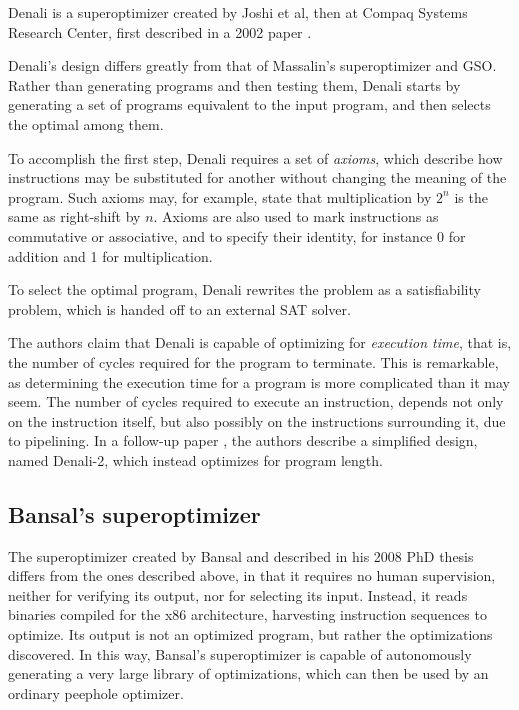 \documentclass[a4paper,11pt]{kth-mag}
\begin{document}
Denali is a superoptimizer created by Joshi et al, then at Compaq Systems Research Center, first described in a 2002 paper \cite{joshi02}.

Denali's design differs greatly from that of Massalin's superoptimizer and GSO.
Rather than generating programs and then testing them, Denali starts by generating a set of programs equivalent to the input program, and then selects the optimal among them.

To accomplish the first step, Denali requires a set of \emph{axioms}, which describe how instructions may be substituted for another without changing the meaning of the program.
Such axioms may, for example, state that multiplication by $2^n$ is the same as right-shift by $n$.
Axioms are also used to mark instructions as commutative or associative, and to specify their identity, for instance 0 for addition and 1 for multiplication.

To select the optimal program, Denali rewrites the problem as a satisfiability problem, which is handed off to an external SAT solver.

The authors claim that Denali is capable of optimizing for \emph{execution time}, that is, the number of cycles required for the program to terminate.
This is remarkable, as determining the execution time for a program is more complicated than it may seem.
The number of cycles required to execute an instruction, depends not only on the instruction itself, but also possibly on the instructions surrounding it, due to pipelining.
In a follow-up paper \cite{joshi06}, the authors describe a simplified design, named Denali-2, which instead optimizes for program length.


\subsection{Bansal's superoptimizer}

The superoptimizer created by Bansal and described in his 2008 PhD thesis \cite{bansal_thesis} differs from the ones described above, in that it requires no human supervision, neither for verifying its output, nor for selecting its input.
Instead, it reads binaries compiled for the x86 architecture, harvesting instruction sequences to optimize.
Its output is not an optimized program, but rather the optimizations discovered.
In this way, Bansal's superoptimizer is capable of autonomously generating a very large library of optimizations, which can then be used by an ordinary peephole optimizer.
\end{document}
